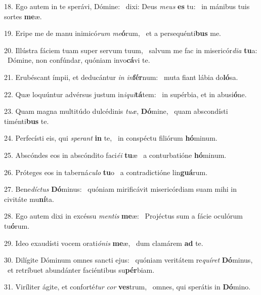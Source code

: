 18. Ego autem in te sperávi, Dómine: \dag\  dixi: Deus \textit{me}\textit{us} \textbf{es} tu: \ast\  in mánibus tuis sortes \textbf{me}æ.\

19. Eripe me de manu inimicó\textit{rum} \textit{me}\textbf{ó}rum, \ast\  et a persequénti\textbf{bus} me.\

20. Illústra fáciem tuam super servum tuum, \dag\  salvum me fac in misericór\textit{di}\textit{a} \textbf{tu}a: \ast\  Dómine, non confúndar, quóniam invo\textbf{cá}vi te.\

21. Erubéscant ímpii, et deducántur \textit{in} \textit{in}\textbf{fér}num: \ast\  muta fiant lábia do\textbf{ló}sa.\

22. Quæ loquúntur advérsus justum in\textit{i}\textit{qui}\textbf{tá}tem: \ast\  in supérbia, et in abusi\textbf{ó}ne.\

23. Quam magna multitúdo dulcédinis \textit{tu}\textit{æ}, \textbf{Dó}mine, \ast\  quam abscondísti timénti\textbf{bus} te.\

24. Perfecísti eis, qui \textit{spe}\textit{rant} \textbf{in} te, \ast\  in conspéctu filiórum \textbf{hó}minum.\

25. Abscóndes eos in abscóndito faci\textit{é}\textit{i} \textbf{tu}æ \ast\  a conturbatióne \textbf{hó}minum.\

26. Próteges eos in taberná\textit{cu}\textit{lo} \textbf{tu}o \ast\  a contradictióne lin\textbf{guá}rum.\

27. Bene\textit{díc}\textit{tus} \textbf{Dó}minus: \ast\  quóniam mirificávit misericórdiam suam mihi in civitáte mu\textbf{ní}ta.\

28. Ego autem dixi in excéssu \textit{men}\textit{tis} \textbf{me}æ: \ast\  Projéctus sum a fácie oculórum tu\textbf{ó}rum.\

29. Ideo exaudísti vocem orati\textit{ó}\textit{nis} \textbf{me}æ, \ast\  dum clamárem \textbf{ad} te.\

30. Dilígite Dóminum omnes sancti ejus: \dag\  quóniam veritátem re\textit{quí}\textit{ret} \textbf{Dó}minus, \ast\  et retríbuet abundánter faciéntibus su\textbf{pér}biam.\

31. Viríliter ágite, et conforté\textit{tur} \textit{cor} \textbf{ves}trum, \ast\  omnes, qui sperátis in \textbf{Dó}mino.\

